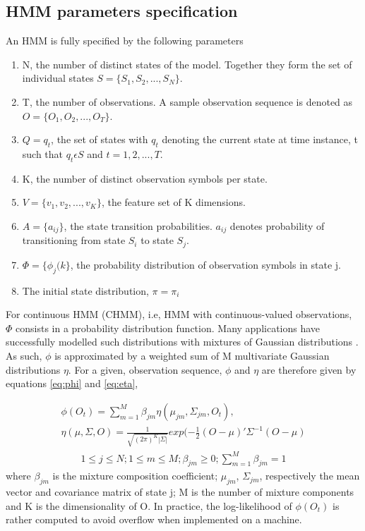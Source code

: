 \subsection{HMM parameters specification}
An HMM is fully specified by the following parameters 
\begin{enumerate}
	\item N, the number of distinct states of the model. Together they form the set of individual states \(S = \{S_1, S_2, ..., S_N\}\).
	\item T, the number of observations. A sample observation sequence is denoted as \(O = \{O_1, O_2, ..., O_T\}\).
	\item \(Q = {q_t}\), the set of states with \(q_t\) denoting the current state at time instance, t such that \(q_t \epsilon S\) and \(t = 1, 2, ..., T\).
	\item K, the number of distinct observation symbols per state. 
	\item \(V = \{v_1, v_2, ..., v_K\}\), the feature set of K dimensions.
	\item \(A =  \{a_{ij} \}\), the state transition probabilities. \(a_{ij}\)  denotes probability of transitioning from state \(S_i\) to state \(S_j\).
	\item \(\Phi =   \{ \phi_{j}(k\}\), the probability distribution of observation symbols in state j.
	\item The initial state distribution, \(\pi = {\pi_i}\)
\end{enumerate}
For continuous HMM (CHMM), i.e, HMM with continuous-valued observations, \(\Phi\) consists in a probability distribution function. Many applications have successfully modelled such distributions with mixtures of Gaussian distributions \cite{cont2013} \cite{ches2012}.
As such, \(\phi\) is approximated by a weighted sum of M multivariate Gaussian distributions \(\eta\). For a given, observation sequence, \(\phi\)  and \(\eta\) are therefore given by equations \ref{eq:phi} and \ref{eq:eta},

\begin{align} 
	\phi(O_t) = \sum_{m=1}^M \beta_{jm} \eta(\mu_{jm}, \Sigma_{jm}, O_t), \label{eq:phi} \\
	\eta(\mu, \Sigma, O) = \frac{1}{\sqrt{(2\pi)^K|\Sigma|}}exp(-\frac{1}{2}(O-\mu)'\Sigma^{-1}(O-\mu) \label{eq:eta}
\end{align} 
\begin{align*}
	1 \leq j \leq N; 1 \leq m  \leq M; \beta_{jm} \geq 0; \sum_{m=1}^{M}\beta_{jm} = 1
\end{align*}
where \(\beta_{jm}\) is the mixture composition coefficient; \(\mu_{jm}\), \(\Sigma_{jm}\), respectively the mean vector and covariance matrix of state j; M is the number of mixture components and K is the dimensionality of O. In practice, the log-likelihood of \(\phi(O_t)\) is rather computed to avoid overflow when implemented on a machine. %

